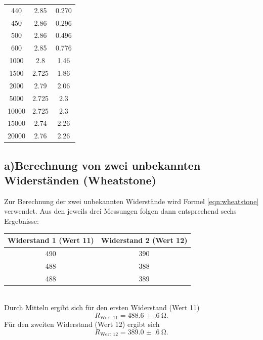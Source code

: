 \documentclass[
  bibliography=totoc,     %
  captions=tableheading,  %
  titlepage=firstiscover, %
]{scrartcl}
\begin{document}
\begin{table}
\begin{tabular}{S[table-format=5.0] S S[table-format=1.4]}
    440 & 2.85 & 0.270\\
    450 & 2.86 & 0.296\\
    500 & 2.86 & 0.496\\
    600 & 2.85 & 0.776\\
    1000 & 2.8 & 1.46\\
    1500 & 2.725 & 1.86\\
    2000 & 2.79 & 2.06\\
    5000 & 2.725 & 2.3\\
    10000 & 2.725 & 2.3\\
    15000 & 2.74 & 2.26\\
    20000 & 2.76 & 2.26\\
    \bottomrule
  \end{tabular}
\end{table}
\newpage
\subsection{a)Berechnung von zwei unbekannten Widerständen (Wheatstone)}
Zur Berechnung der zwei unbekannten Widerstände wird Formel \eqref{eqn:wheatstone}
verwendet. Aus den jeweils drei Messungen folgen dann entsprechend sechs Ergebnisse:
\begin{table}
  \centering
  \label{tab:ergebnisse1}
  \begin{tabular}{c c}
    \toprule
    Widerstand 1 (Wert 11) & Widerstand 2 (Wert 12)\\
    \midrule
    \num{490} & \num{390}\\
    \num{488} & \num{388}\\
    \num{488} & \num{389}\\
    \bottomrule
  \end{tabular}
\end{table}
\\
Durch Mitteln ergibt sich für den ersten Widerstand (Wert 11)
\begin{equation}
  R_\text{Wert 11} = \SI{488.6(6)}{\ohm}.
\end{equation}
Für den zweiten Widerstand (Wert 12) ergibt sich
\begin{equation}
  R_\text{Wert 12} = \SI{389.0(6)}{\ohm}.
\end{equation}
\end{document}
